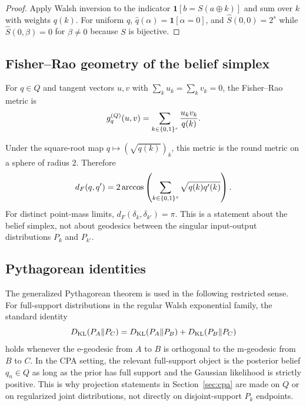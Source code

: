 \begin{proof}
Apply Walsh inversion to the indicator
$\mathbf 1[b=S(a\oplus k)]$ and sum over $k$ with weights $q(k)$.  For uniform
$q$, $\widehat q(\alpha)=\mathbf 1[\alpha=0]$, and
$\widehat S(0,0)=2^s$ while $\widehat S(0,\beta)=0$ for $\beta\neq0$ because
$S$ is bijective.
\end{proof}

\subsection{Fisher--Rao geometry of the belief simplex}\label{subsec:belief-geometry}

\begin{definition}\label{def:belief-simplex}
For $q\in Q$ and tangent vectors $u,v$ with $\sum_k u_k=\sum_k v_k=0$, the
Fisher--Rao metric is
\begin{equation}\label{eq:belief-fisher}
  g_q^{(Q)}(u,v)=\sum_{k\in\{0,1\}^{s}}\frac{u_kv_k}{q(k)}.
\end{equation}
\end{definition}

Under the square-root map $q\mapsto(\sqrt{q(k)})_k$, this metric is the round
metric on a sphere of radius $2$.  Therefore
\begin{equation}\label{eq:hellinger-angle}
  d_F(q,q')=2\arccos\left(\sum_{k\in\{0,1\}^{s}}\sqrt{q(k)q'(k)}\right).
\end{equation}
For distinct point-mass limits, $d_F(\delta_k,\delta_{k'})=\pi$.  This is a
statement about the belief simplex, not about geodesics between the singular
input-output distributions $P_k$ and $P_{k'}$.

\subsection{Pythagorean identities}\label{subsec:pythagorean}

The generalized Pythagorean theorem is used in the following restricted sense.
For full-support distributions in the regular Walsh exponential family, the
standard identity
\begin{equation}\label{eq:pythagorean-interior}
  D_{\mathrm{KL}}(P_A\|P_C)=D_{\mathrm{KL}}(P_A\|P_B)+D_{\mathrm{KL}}(P_B\|P_C)
\end{equation}
holds whenever the e-geodesic from $A$ to $B$ is orthogonal to the m-geodesic
from $B$ to $C$.  In the CPA setting, the relevant full-support object is the
posterior belief $q_n\in Q$ as long as the prior has full support and the
Gaussian likelihood is strictly positive.  This is why projection statements in
Section~\ref{sec:cpa} are made on $Q$ or on regularized joint distributions,
not directly on disjoint-support $P_k$ endpoints.
